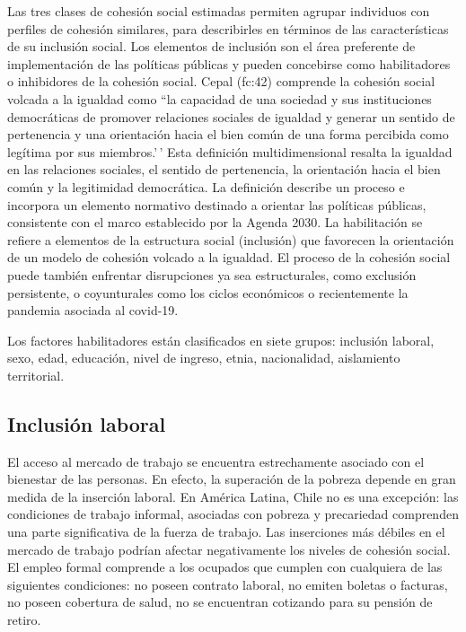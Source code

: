 \documentclass[
  12pt,
]{book}
\begin{document}
Las tres clases de cohesión social estimadas permiten agrupar individuos con perfiles de cohesión similares, para describirles en términos de las características de su inclusión social. Los elementos de inclusión son el área preferente de implementación de las políticas públicas y pueden concebirse como habilitadores o inhibidores de la cohesión social. Cepal (fc:42) comprende la cohesión social volcada a la igualdad como ``la capacidad de una sociedad y sus instituciones democráticas de promover relaciones sociales de igualdad y generar un sentido de pertenencia y una orientación hacia el bien común de una forma percibida como legítima por sus miembros.'\,' Esta definición multidimensional resalta la igualdad en las relaciones sociales, el sentido de pertenencia, la orientación hacia el bien común y la legitimidad democrática. La definición describe un proceso e incorpora un elemento normativo destinado a orientar las políticas públicas, consistente con el marco establecido por la Agenda 2030. La habilitación se refiere a elementos de la estructura social (inclusión) que favorecen la orientación de un modelo de cohesión volcado a la igualdad. El proceso de la cohesión social puede también enfrentar disrupciones ya sea estructurales, como exclusión persistente, o coyunturales como los ciclos económicos o recientemente la pandemia asociada al covid-19.

Los factores habilitadores están clasificados en siete grupos: inclusión laboral, sexo, edad, educación, nivel de ingreso, etnia, nacionalidad, aislamiento territorial.

\hypertarget{inclusiuxf3n-laboral}{%
\subsection{Inclusión laboral}\label{inclusiuxf3n-laboral}}

El acceso al mercado de trabajo se encuentra estrechamente asociado con el bienestar de las personas. En efecto, la superación de la pobreza depende en gran medida de la inserción laboral. En América Latina, Chile no es una excepción: las condiciones de trabajo informal, asociadas con pobreza y precariedad comprenden una parte significativa de la fuerza de trabajo. Las inserciones más débiles en el mercado de trabajo podrían afectar negativamente los niveles de cohesión social. El empleo formal comprende a los ocupados que cumplen con cualquiera de las siguientes condiciones: no poseen contrato laboral, no emiten boletas o facturas, no poseen cobertura de salud, no se encuentran cotizando para su pensión de retiro.
\end{document}
